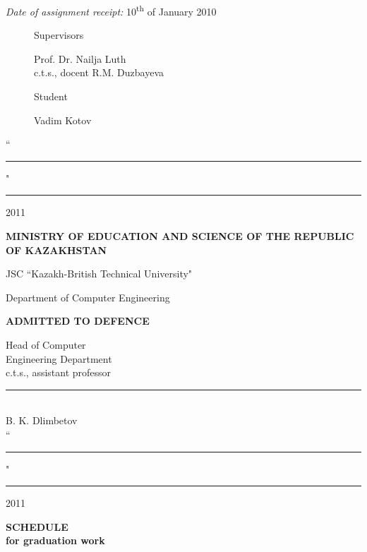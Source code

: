 \begin{titlepage}
	\emph{Date of assignment receipt:} 10\textsuperscript{th} of January 2010

	\begin{figure}[ht]
		\begin{minipage}[t]{0.5\linewidth}
			Supervisors
		\end{minipage}
		\begin{minipage}[t]{0.5\linewidth}
			Prof. Dr. Nailja Luth\\
			c.t.s., docent R.M. Duzbayeva
		\end{minipage}
	\end{figure}
	\begin{figure}[ht]
		\begin{minipage}[t]{0.5\linewidth}
			Student
		\end{minipage}
		\begin{minipage}[t]{0.5\linewidth}
			Vadim Kotov
		\end{minipage}
	\end{figure}
	``\rule{2em}{0.4pt}" \rule{8em}{0.4pt} 2011\\

	\pagebreak

	\begin{centering}
		{\bf{\MakeUppercase{Ministry of education and science of the republic of Kazakhstan}}

		\vspace{12pt}

		JSC ``Kazakh-British Technical University"

		Department of Computer Engineering}

		\begin{flushright}
			{\bf \MakeUppercase{Admitted to defence}}

			Head of Computer\\
			Engineering Department\\
			c.t.s., assistant professor\\
			\vspace{0.5\baselineskip}
			\rule{13em}{0.4pt}\\
			B. K. Dlimbetov\\
			\vspace{0.5\baselineskip}
			``\rule{2em}{0.4pt}" \rule{8em}{0.4pt} 2011\\
		\end{flushright}

		{\bf
		\MakeUppercase{Schedule}\\
		for graduation work}


\end{centering}
\end{titlepage}
